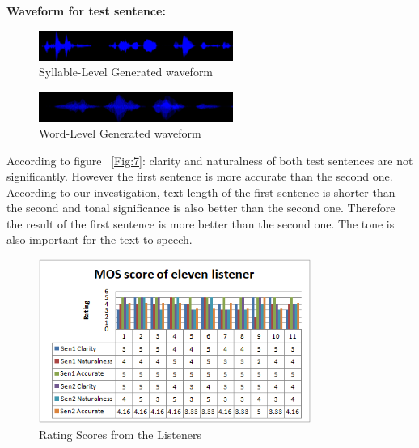 \documentclass[journal,transmag]{JIISTjrnl}
\begin{document}
\textbf{Waveform for test sentence:}
\begin{figure}[H]
\centering
\includegraphics[width=2.5in]{Q2.png}
\caption{Syllable-Level Generated waveform}
\label{Fig:4}
\end{figure}
\begin{figure}[H]
\centering
\includegraphics[width=2.5in]{wq2.png}
\caption{Word-Level Generated waveform}
\label{Fig:5}
\end{figure}


According to figure ~\ref{Fig:7}:  clarity and naturalness of both test sentences are not significantly. However the first sentence is more accurate than the second one. According to our investigation, text length of the first sentence is shorter than the second and tonal significance is also better than the second one. Therefore the result of the first sentence is more better than the second one. The tone is also important for the text to speech.\\
\begin{figure}[H]
\centering
\includegraphics[width=3.5in]{score.png}
\caption{Rating Scores from the Listeners}
\label{Fig:6}
\end{figure}
\end{document}
